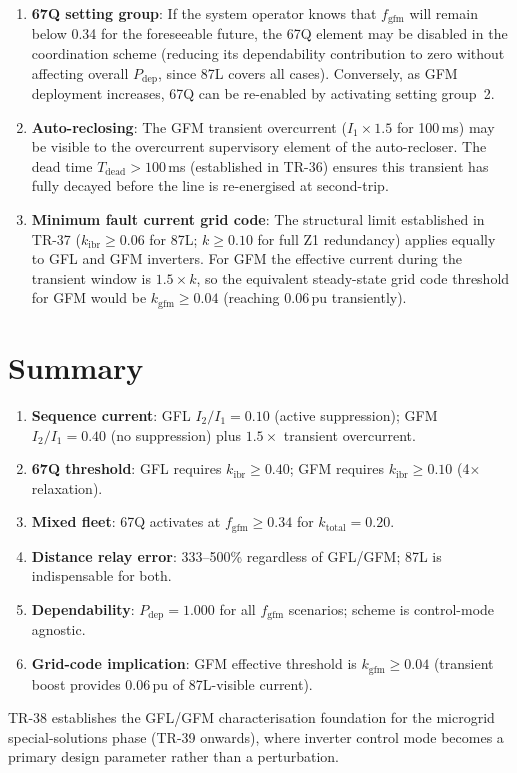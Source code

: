 \documentclass[11pt,a4paper]{article}
\begin{document}
\begin{enumerate}
  \item \textbf{67Q setting group}: If the system operator knows that
    $f_\mathrm{gfm}$ will remain below 0.34 for the foreseeable future, the
    67Q element may be disabled in the coordination scheme (reducing its
    dependability contribution to zero without affecting overall $P_\mathrm{dep}$,
    since 87L covers all cases).  Conversely, as GFM deployment increases,
    67Q can be re-enabled by activating setting group~2.

  \item \textbf{Auto-reclosing}: The GFM transient overcurrent
    ($I_1\times1.5$ for 100\,ms) may be visible to the overcurrent supervisory
    element of the auto-recloser.  The dead time $T_\mathrm{dead}>100$\,ms
    (established in TR-36) ensures this transient has fully decayed before
    the line is re-energised at second-trip.

  \item \textbf{Minimum fault current grid code}: The structural limit
    established in TR-37 ($k_\mathrm{ibr}\geq0.06$ for 87L; $k\geq0.10$ for
    full Z1 redundancy) applies equally to GFL and GFM inverters.  For GFM
    the effective current during the transient window is $1.5\times k$, so
    the equivalent steady-state grid code threshold for GFM would be
    $k_\mathrm{gfm}\geq0.04$ (reaching 0.06\,pu transiently).
\end{enumerate}

\section{Summary}
\label{sec:summary}

\begin{enumerate}
  \item \textbf{Sequence current}: GFL $I_2/I_1=0.10$ (active suppression);
    GFM $I_2/I_1=0.40$ (no suppression) plus $1.5\times$ transient overcurrent.

  \item \textbf{67Q threshold}: GFL requires $k_\mathrm{ibr}\geq0.40$; GFM
    requires $k_\mathrm{ibr}\geq0.10$ (4$\times$ relaxation).

  \item \textbf{Mixed fleet}: 67Q activates at $f_\mathrm{gfm}\geq0.34$ for
    $k_\mathrm{total}=0.20$.

  \item \textbf{Distance relay error}: 333--500\% regardless of GFL/GFM; 87L
    is indispensable for both.

  \item \textbf{Dependability}: $P_\mathrm{dep}=1.000$ for all $f_\mathrm{gfm}$
    scenarios; scheme is control-mode agnostic.

  \item \textbf{Grid-code implication}: GFM effective threshold is
    $k_\mathrm{gfm}\geq0.04$ (transient boost provides 0.06\,pu of 87L-visible
    current).
\end{enumerate}

\noindent
TR-38 establishes the GFL/GFM characterisation foundation for the microgrid
special-solutions phase (TR-39 onwards), where inverter control mode becomes a
primary design parameter rather than a perturbation.



\end{document}
